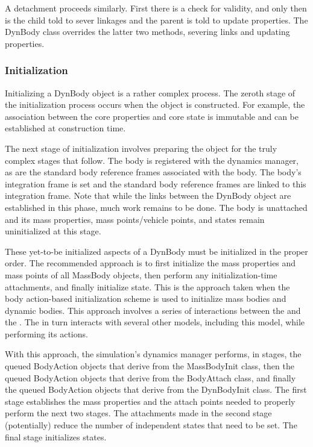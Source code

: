A detachment proceeds similarly. First there is a check for validity,
and only then is the child told to sever linkages and the parent is told
to update properties. The DynBody class overrides the latter two methods,
severing links and updating properties.

\subsubsection{Initialization}\label{sec:key_initialization}
Initializing a DynBody object is a rather complex process. The zeroth stage
of the initialization process occurs when the object is constructed.
For example, the association between the core properties and core state is
immutable and can be established at construction time.

The next stage of initialization involves preparing the object for the truly
complex stages that follow. The body is registered with the dynamics manager,
as are the standard body reference frames associated with the body. The
body's integration frame is set and the standard body reference frames are
linked to this integration frame. Note that while the links between the
DynBody object are established in this phase, much work remains to be done.
The body is unattached and its mass properties, mass points/vehicle points, and
states remain uninitialized at this stage.

These yet-to-be initialized aspects of a DynBody must be initialized in the
proper order. The recommended approach is to first initialize the mass
properties and mass points of all MassBody objects, then perform any
initialization-time attachments, and finally initialize state. This is
the approach taken when the body action-based initialization scheme is used
to initialize mass bodies and dynamic bodies.
This approach involves a series of interactions
between the  and the .
The \BODYACTION in turn interacts with
several other models, including this model, while performing its actions.

With this approach, the simulation's dynamics manager performs, in stages,
the queued BodyAction objects that derive from the MassBodyInit class,
then the queued BodyAction objects that derive from the BodyAttach class,
and finally the queued BodyAction objects that derive from the DynBodyInit
class.
The first stage establishes the mass properties and the attach points needed to
properly perform the next two stages. The attachments made in the second stage
(potentially) reduce the number of independent states that need to be set.
The final stage initializes states.

